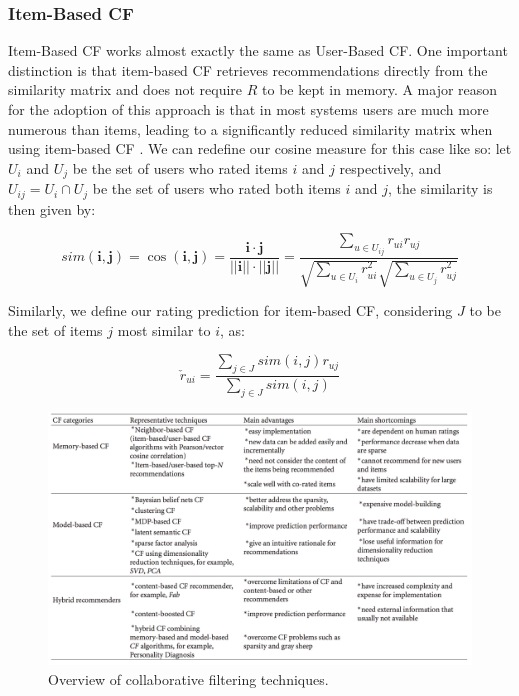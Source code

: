 \documentclass[cic,tc,english]{iiufrgs}
\begin{document}
\subsubsection{Item-Based CF}
Item-Based CF works almost exactly the same as User-Based CF. One important distinction is that item-based CF retrieves recommendations directly from the similarity matrix and does not require $R$ to be kept in memory. A major reason for the adoption of this approach is that in most systems users are much more numerous than items, leading to a significantly reduced similarity matrix when using item-based CF \cite{Sarwar2001}. We can redefine our cosine measure for this case like so: let $U_i$ and $U_j$ be the set of users who rated items $i$ and $j$ respectively, and $U_{ij} = U_i \cap U_j$ be the set of users who rated both items $i$ and $j$, the similarity is then given by:


\[sim(\pmb i, \pmb j) = \cos(\pmb i, \pmb j) = \frac {\pmb i \cdot \pmb j}{||\pmb i|| \cdot ||\pmb j||} = \frac{\sum_{u \in U_{ij}} r_{ui}r_{uj}}{\sqrt{\sum_{u \in U_i} r_{ui}^2}\sqrt{\sum_{u \in U_j} r_{uj}^2}}\]

Similarly, we define our rating prediction for item-based CF, considering $J$ to be the set of items $j$ most similar to $i$, as:

$$
\check{r}_{ui} = \frac{\sum_{j \in J} sim(i, j)r_{uj}}{\sum_{j \in J} sim(i, j)}
$$

\begin{figure}
    \caption{Overview of collaborative filtering techniques.}
    \begin{center}
        \includegraphics[width=35em]{cf-comparison}
    \end{center}
    \label{fig:cf-comparison}
\end{figure}
\end{document}

